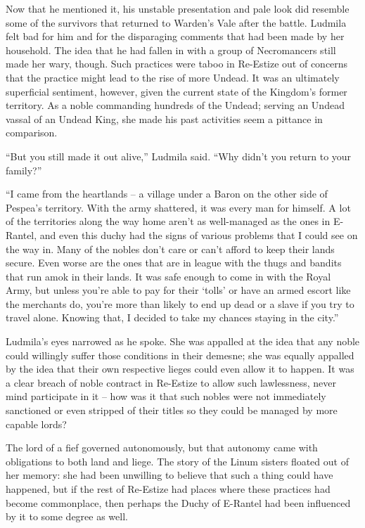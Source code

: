 Now that he mentioned it, his unstable presentation and pale look did resemble some of the survivors that returned to Warden’s Vale after the battle. Ludmila felt bad for him and for the disparaging comments that had been made by her household. The idea that he had fallen in with a group of Necromancers still made her wary, though. Such practices were taboo in Re-Estize out of concerns that the practice might lead to the rise of more Undead. It was an ultimately superficial sentiment, however, given the current state of the Kingdom’s former territory. As a noble commanding hundreds of the Undead; serving an Undead vassal of an Undead King, she made his past activities seem a pittance in comparison.

 

“But you still made it out alive,” Ludmila said. “Why didn’t you return to your family?”

 

“I came from the heartlands – a village under a Baron on the other side of Pespea’s territory. With the army shattered, it was every man for himself. A lot of the territories along the way home aren’t as well-managed as the ones in E-Rantel, and even this duchy had the signs of various problems that I could see on the way in. Many of the nobles don’t care or can’t afford to keep their lands secure. Even worse are the ones that are in league with the thugs and bandits that run amok in their lands. It was safe enough to come in with the Royal Army, but unless you’re able to pay for their ‘tolls’ or have an armed escort like the merchants do, you’re more than likely to end up dead or a slave if you try to travel alone. Knowing that, I decided to take my chances staying in the city.”

 

Ludmila’s eyes narrowed as he spoke. She was appalled at the idea that any noble could willingly suffer those conditions in their demesne; she was equally appalled by the idea that their own respective lieges could even allow it to happen. It was a clear breach of noble contract in Re-Estize to allow such lawlessness, never mind participate in it – how was it that such nobles were not immediately sanctioned or even stripped of their titles so they could be managed by more capable lords?

 

The lord of a fief governed autonomously, but that autonomy came with obligations to both land and liege. The story of the Linum sisters floated out of her memory: she had been unwilling to believe that such a thing could have happened, but if the rest of Re-Estize had places where these practices had become commonplace, then perhaps the Duchy of E-Rantel had been influenced by it to some degree as well.

